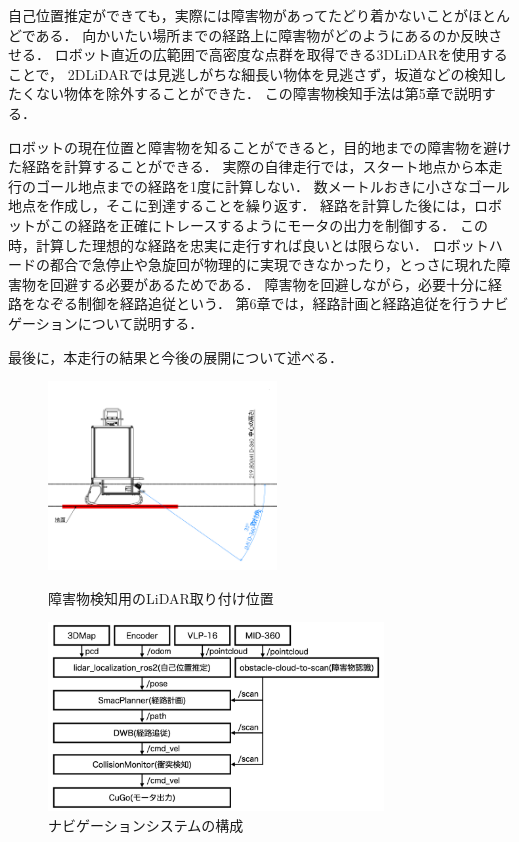 自己位置推定ができても，実際には障害物があってたどり着かないことがほとんどである．
向かいたい場所までの経路上に障害物がどのようにあるのか反映させる．
ロボット直近の広範囲で高密度な点群を取得できる3DLiDARを使用することで，
2DLiDARでは見逃しがちな細長い物体を見逃さず，坂道などの検知したくない物体を除外することができた．
この障害物検知手法は第5章で説明する．

ロボットの現在位置と障害物を知ることができると，目的地までの障害物を避けた経路を計算することができる．
実際の自律走行では，スタート地点から本走行のゴール地点までの経路を1度に計算しない．
数メートルおきに小さなゴール地点を作成し，そこに到達することを繰り返す．
経路を計算した後には，ロボットがこの経路を正確にトレースするようにモータの出力を制御する．
この時，計算した理想的な経路を忠実に走行すれば良いとは限らない．
ロボットハードの都合で急停止や急旋回が物理的に実現できなかったり，とっさに現れた障害物を回避する必要があるためである．
障害物を回避しながら，必要十分に経路をなぞる制御を経路追従という．
第6章では，経路計画と経路追従を行うナビゲーションについて説明する．

最後に，本走行の結果と今後の展開について述べる．

\begin{figure}[htbp]
    \centering
    \begin{minipage}[b]{0.45\hsize}
       \centering
       \includegraphics[height=5cm]{fig/obstacle_detection_range_sideview.png}
       \caption{障害物検知用のLiDAR取り付け位置}
       \label{fig:detection}
    \end{minipage}
    \begin{minipage}[b]{0.45\hsize}
       \centering
       \includegraphics[height=5cm]{fig/system.png}
       \caption{ナビゲーションシステムの構成}
       \label{fig:system}
    \end{minipage}
\end{figure}
